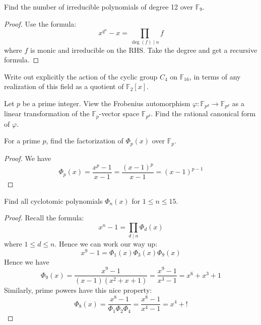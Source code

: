 \documentclass[openany]{book}
\begin{document}
\begin{prob}
Find the number of irreducible polynomials of degree 12 over $\mathbb{F}_9$.
\end{prob}
\begin{proof}
    Use the formula:
    \begin{equation*}
        x^{q^n}-x=\prod_{\deg(f)\mid n}f
    \end{equation*}
    where $f$ is monic and irreducible on the RHS. Take the degree and get a recursive formula.
\end{proof}


\begin{prob}
Write out explicitly the action of the cyclic group $C_4$ on $\mathbb{F}_{16}$, in terms of any realization of this field as a quotient of $\mathbb{F}_2[x]$.
\end{prob}

\begin{prob}
Let $p$ be a prime integer. View the Frobenius automorphism $\varphi : \mathbb{F}_{p^d} \to \mathbb{F}_{p^d}$ as a linear transformation of the $\mathbb{F}_p$-vector space $\mathbb{F}_{p^d}$. Find the rational canonical form of $\varphi$.
\end{prob}

\begin{prob}
For a prime $p$, find the factorization of $\Phi_p(x)$ over $\mathbb{F}_p$.
\end{prob}
\begin{proof}
    We have 
    \begin{equation*}
        \Phi_p(x)=\frac{x^p-1}{x-1}=\frac{(x-1)^p}{x-1}=(x-1)^{p-1}
    \end{equation*}
\end{proof}


\begin{prob}
Find all cyclotomic polynomials $\Phi_n(x)$ for $1 \leq n \leq 15$. 
\end{prob}
\begin{proof}
    Recall the formula:
    \begin{equation*}
        x^n-1=\prod_{d \mid n}\Phi_d(x)
    \end{equation*}
    where $1\leq d\leq n$. Hence we can work our way up:
    \begin{equation*}
        x^9-1=\Phi_1(x)\Phi_3(x)\Phi_9(x)
    \end{equation*}
    Hence we have 
    \begin{equation*}
        \Phi_9(x)=\frac{x^9-1}{(x-1)(x^2+x+1)}=\frac{x^9-1}{x^3-1}=x^6+x^3+1
    \end{equation*}
    Similarly, prime powers have this nice property:
    \begin{equation*}
        \Phi_8(x)=\frac{x^8-1}{\Phi_1\Phi_2\Phi_4}=\frac{x^8-1}{x^4-1}=x^4+!
    \end{equation*}
\end{proof}
\end{document}
